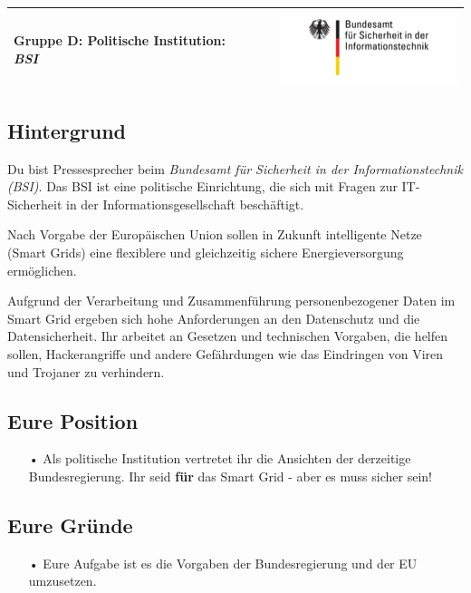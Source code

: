 \documentclass[11pt,a4paper,DIV=10,parskip=half,BCOR=0mm]{scrartcl}
\begin{document}
%
\setlength{\tabcolsep}{0mm} %
\begin{tabularx}{\linewidth}{lXr}
{\Large\textsf{\textbf{Gruppe D:} Politische Institution: \textit{BSI}}} & & \includegraphics[scale=0.6]{images/bsi}\\
\hline
\end{tabularx}
%
\subsection*{Hintergrund}
Du bist Pressesprecher beim\textit{ Bundesamt für Sicherheit in der Informationstechnik (BSI)}. Das BSI ist eine politische Einrichtung, die sich mit Fragen zur IT-Sicherheit in der Informationsgesellschaft beschäftigt. 

Nach Vorgabe der Europäischen Union sollen in Zukunft intelligente Netze (Smart Grids) eine flexiblere und gleichzeitig sichere Energieversorgung ermöglichen.

Aufgrund der Verarbeitung und Zusammenführung  personenbezogener Daten  im Smart Grid ergeben sich hohe Anforderungen an den Datenschutz und die Datensicherheit. Ihr arbeitet an Gesetzen und technischen Vorgaben, die helfen sollen, Hackerangriffe und andere Gefährdungen wie das Eindringen von Viren und Trojaner zu verhindern.
\subsection*{Eure Position}
\begin{enumerate}
	\item[•]Als politische Institution vertretet ihr die Ansichten der derzeitige Bundesregierung. Ihr seid \textbf{für} das Smart Grid - aber es muss sicher sein!
\end{enumerate}
\subsection*{Eure Gründe}
\begin{enumerate}
	\item[•] Eure Aufgabe ist es die Vorgaben der Bundesregierung und der EU umzusetzen.

\end{enumerate}
\end{document}
